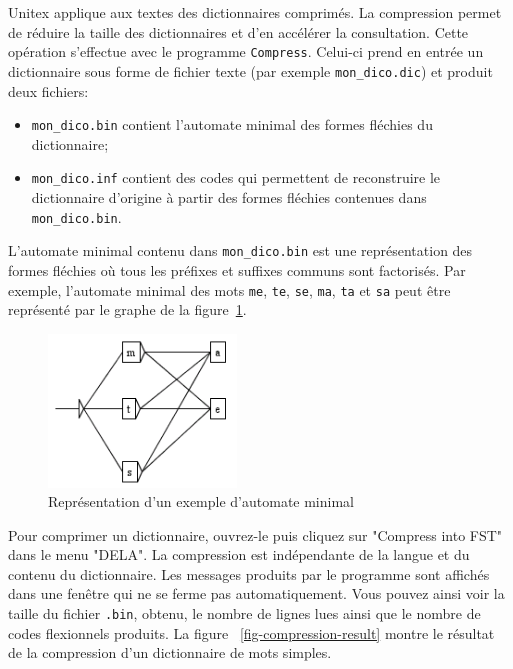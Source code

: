Unitex applique aux textes des dictionnaires comprimés. La compression permet de réduire
la taille des dictionnaires et d’en accélérer la consultation. Cette opération s’effectue
avec le programme \verb+Compress+. 
Celui-ci prend en entrée un dictionnaire sous forme de fichier texte (par exemple
	\verb+mon_dico.dic+) et produit deux fichiers:

\begin{itemize}
  \item \verb+mon_dico.bin+ contient l’automate minimal des formes fléchies du dictionnaire;
  \item \verb+mon_dico.inf+ contient des codes qui permettent de
  	  reconstruire le dictionnaire d’origine à partir
  	  des formes fléchies contenues dans \verb+mon_dico.bin+.
\end{itemize}

\noindent L’automate minimal contenu dans \verb+mon_dico.bin+ est une représentation des formes
fléchies où tous les préfixes et suffixes
communs sont factorisés. Par exemple, l’automate minimal des mots \verb+me+, \verb+te+, \verb+se+,
\verb+ma+, \verb+ta+ et \verb+sa+
peut être représenté par le graphe de la figure~\ref{fig-example-minimal-automaton}.
\bigskip \begin{figure}[!h]
\begin{center}
\includegraphics[width=5cm]{resources/img/fig3-10.png}
\caption{Représentation d’un exemple d’automate minimal\label{fig-example-minimal-automaton}}
\end{center}
\end{figure}

\noindent    Pour comprimer un dictionnaire, ouvrez-le puis cliquez sur "Compress into FST" dans le
menu "DELA". La compression est indépendante de la langue et du contenu du dictionnaire.
Les messages produits par le programme sont affichés dans une fenêtre qui ne se ferme pas
automatiquement. Vous pouvez ainsi voir la taille du fichier
\verb+.bin+, obtenu, le nombre de lignes lues ainsi que le nombre de codes flexionnels produits. La
figure ~\ref{fig-compression-result}
montre le résultat de la compression d’un dictionnaire de mots simples.

